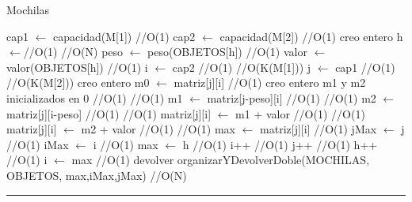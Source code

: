 \begin{algorithm}[H]
\caption{Mochilas}
\begin{algorithmic}[1]
\state cap1 $\gets$ capacidad(M[1]) \hfill //O(1)
\state cap2 $\gets$ capacidad(M[2]) \hfill //O(1)
\state creo entero h $\gets$\hfill //O(1)
 \hfill //O(N)
\state peso $\gets$ peso(OBJETOS[h]) \hfill //O(1)
\state valor $\gets$ valor(OBJETOS[h]) \hfill //O(1)
\state i $\gets$  cap2  \hfill //O(1)
 \hfill //O(K(M[1]))
\state j $\gets$  cap1  \hfill //O(1)
 \hfill //O(K(M[2]))
\state creo entero m0 $\gets$ matriz[j][i] \hfill //O(1)
\state creo entero m1 y m2 inicializados en 0 \hfill //O(1)
 \hfill //O(1)
\state m1 $\gets$ matriz[j-peso][i] \hfill //O(1)
\endif
{} \hfill //O(1)
\state m2 $\gets$ matriz[j][i-peso] \hfill //O(1)
\endif
{} \hfill //O(1)
\state matriz[j][i] $\gets$ m1 + valor \hfill //O(1)
\Else
{} \hfill //O(1)
\state matriz[j][i] $\gets$ m2 + valor \hfill //O(1)
\endif
{} \hfill //O(1)
\state max $\gets$ matriz[j][i] \hfill //O(1)
\state jMax $\gets$ j \hfill //O(1)
\state iMax $\gets$ i \hfill //O(1)
\state max $\gets$ h \hfill //O(1)
\endif
\endif
\state i++ \hfill //O(1)
\endwhile
\state j++ \hfill //O(1)
\endwhile
\state h++ \hfill //O(1)
\endwhile
\state i $\gets$ max \hfill //O(1)
\state devolver organizarYDevolverDoble(MOCHILAS, OBJETOS, max,iMax,jMax) \hfill //O(N)
\EndFunction 
\end{algorithmic}
\hrule
{}
\end{algorithm}

